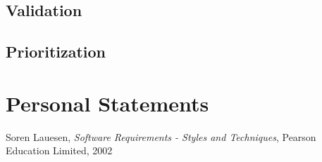 \documentclass[10pt,a4paper]{article}
\begin{document}
\subsection{Validation}

\subsection{Prioritization}

\section{Personal Statements}

\begin{thebibliography}{99}
	Soren Lauesen,
  	\emph{Software Requirements - Styles and Techniques},
  	Pearson Education Limited, 2002


\end{thebibliography}
\end{document}
